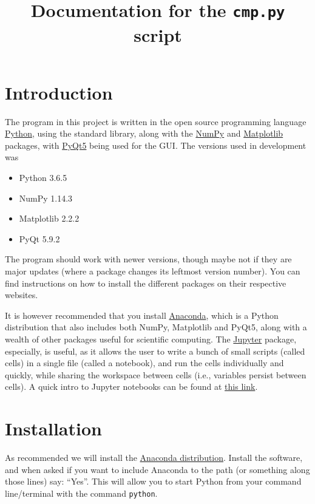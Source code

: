 \documentclass[a4paper,11pt]{article}
\title{Documentation for the \texorpdfstring{\texttt{cmp.py}}{cmp.py} script}
\date{}
\numberwithin{equation}{section}
\begin{document}
	\maketitle
	
	\section{Introduction}
	The program in this project is written in the open source programming language \href{www.python.org}{Python}, using the standard library, along with the \href{www.numpy.org}{NumPy} and \href{www.matplotlib.org}{Matplotlib} packages, with \href{www.pypi.org/project/PyQt5/}{PyQt5} being used for the GUI. The versions used in development was
	\begin{itemize}
		\item Python 3.6.5
		\item NumPy 1.14.3
		\item Matplotlib 2.2.2
		\item PyQt 5.9.2
	\end{itemize}
	The program should work with newer versions, though maybe not if they are major updates (where a package changes its leftmost version number). You can find instructions on how to install the different packages on their respective websites.
	
	It is however recommended that you install \href{https://www.anaconda.com/}{Anaconda}, which is a Python distribution that also includes both NumPy, Matplotlib and PyQt5, along with a wealth of other packages useful for scientific computing. The \href{http://jupyter.org/}{Jupyter} package, especially, is useful, as it allows the user to write a bunch of small scripts (called cells) in a single file (called a notebook), and run the cells individually and quickly, while sharing the workspace between cells (i.e., variables persist between cells). A quick intro to Jupyter notebooks can be found at \href{http://nbviewer.jupyter.org/github/jupyter/notebook/blob/master/docs/source/examples/Notebook/Notebook Basics.ipynb}{this link}.
	
	\section{Installation}
	As recommended we will install the \href{https://www.anaconda.com/download/}{Anaconda distribution}. Install the software, and when asked if you want to include Anaconda to the path (or something along those lines) say: ``Yes''. This will allow you to start Python from your command line/terminal with the command \texttt{python}.
	
\end{document}
